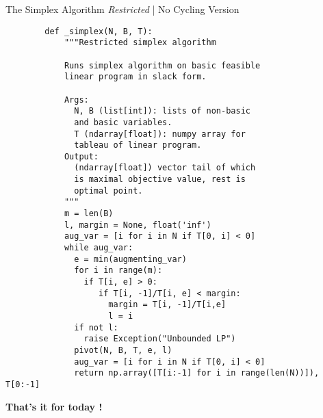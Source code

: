 \documentclass[aspectratio = 169]{beamer}
\begin{document}
\begin{frame}[fragile]{The Simplex Algorithm \emph{Restricted} | No Cycling Version}
  \begin{overlayarea}{1.1\textwidth}{.75\textheight}
  \setlength{\columnsep}{-10pt}
  \begin{multicols}{2}
    \scriptsize{
      \begin{verbatim}
        def _simplex(N, B, T):
            """Restricted simplex algorithm

            Runs simplex algorithm on basic feasible
            linear program in slack form.

            Args:
              N, B (list[int]): lists of non-basic
              and basic variables.
              T (ndarray[float]): numpy array for
              tableau of linear program.
            Output:
              (ndarray[float]) vector tail of which
              is maximal objective value, rest is
              optimal point.
            """
            m = len(B)
            l, margin = None, float('inf')
            aug_var = [i for i in N if T[0, i] < 0]
            while aug_var:
              e = min(augmenting_var)
              for i in range(m):
                if T[i, e] > 0:
                   if T[i, -1]/T[i, e] < margin:
                     margin = T[i, -1]/T[i,e]
                     l = i
              if not l:
                raise Exception("Unbounded LP")
              pivot(N, B, T, e, l)
              aug_var = [i for i in N if T[0, i] < 0]
              return np.array([T[i:-1] for i in range(len(N))]), T[0:-1]
      \end{verbatim}
    }
  \end{multicols}
  \end{overlayarea}
\end{frame}

\begin{frame}
  \centering
  {\huge \textbf{That's it for today !}}
\end{frame}
\end{document}
